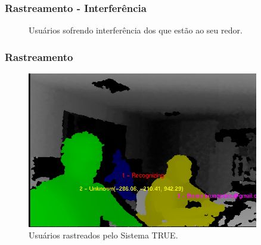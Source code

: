\documentclass{beamer}
\begin{document}
	    \begin{frame}
	    	\frametitle{Rastreamento - Interferência}
	    	
			\begin{figure}[htb]
				\begin{center}
				\end{center}
				\caption{Usuários sofrendo interferência dos que estão ao seu redor.}
				\label{fig:testes_relacionamento_com_usuarios}
			\end{figure}
	    \end{frame}
		
		\begin{frame}
	    	\frametitle{Rastreamento}
			
			\begin{figure}[htb]
				\begin{center}
					\includegraphics[width=0.9\textwidth]{figuras/5.Testes/oclusao/usuarios-rastreados.png}
				\end{center}
				\caption{Usuários rastreados pelo Sistema TRUE.}
				\label{fig:varios-usuarios-ambiente}
			\end{figure}
	    \end{frame}    
   
\end{document}
